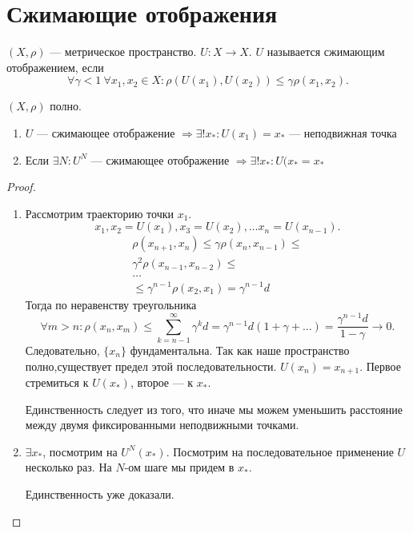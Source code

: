 \section{Сжимающие отображения}
\begin{defn}
    $ (X, \rho)$ --- метрическое пространство. $ U: X \to  X$. $ U$ называется {\sf сжимающим отображением}, если
    \[
	\forall  \gamma < 1 ~ \forall  x_1, x_2 \in X\colon \rho(U(x_1), U(x_2)) \le  \gamma \rho(x_1, x_2)
    .\]
\end{defn}
\begin{thm}
    $ (X, \rho)$ полно.
    $ $
    \begin{enumerate}
	\item $ U$ --- сжимающее отображение $ \Longrightarrow \exists! x_{*} \colon U(x_1) = x_{*}$ --- неподвижная точка
	\item Если  $ \exists  N \colon U^{N}$ --- сжимающее отображение $ \Longrightarrow \exists  ! x_{*} \colon U(x_{*} = x_{*}$
    \end{enumerate}
\end{thm}
\begin{proof}
    $ $
    \begin{enumerate}
	\item  Рассмотрим траекторию точки $ x_1$.
	    \[
		x_1, x_2=U(x_1), x_3=U(x_2), \ldots x_n = U(x_{n-1})
	    .\]
	    \begin{align*}
		\rho(x_{n+1}, x_{n}) \le  \gamma \rho(x_n, x_{n-1}) \le  \\
		\gamma^2 \rho(x_{n-1}, x_{n-2}) \le  \\
		\ldots \\
		\le \gamma^{n-1} \rho(x_2, x_1) = \gamma^{n-1}d
	    \end{align*}
	    Тогда по неравенству треугольника
	    \[
		\forall m > n\colon \rho(x_n, x_m) \le \sum^{\infty}_{k=n-1} \gamma^{k}d = \gamma ^{n-1}d(1 + \gamma+ \ldots ) = \frac{\gamma^{n-1} d}{1-\gamma} \longrightarrow 0
	    .\]
	    Следовательно, $ \{x_n\}$ фундаментальна. Так как наше пространство полно,существует предел этой последовательности.
	    $ U(x_{n}) = x_{n+1}$. Первое стремиться к  $ U(x_{*})$, второе --- к $ x_*$.

	    Единственность следует из того, что иначе мы можем уменьшить расстояние между двумя фиксированными неподвижными точками.
	\item $ \exists x_*$, посмотрим на $ U^{N}(x_*)$. Посмотрим на последовательное применение $ U$ несколько раз. На $ N $-ом шаге мы придем в  $ x_*$.

	    Единственность уже доказали.
    \end{enumerate}
\end{proof}
